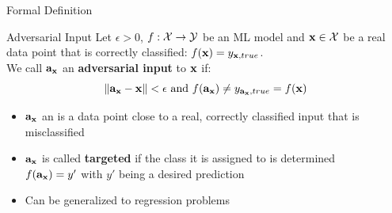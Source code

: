 \documentclass[10pt,compress,t,notes=noshow, xcolor=table]{beamer}
\begin{document}
\begin{vbframe}[c]{Formal Definition}
\begin{block}{Adversarial Input}
Let $\epsilon>0$, $f:\mathcal{X} \rightarrow \mathcal{Y}$ be an ML model and $\mathbf{x} \in \mathcal{X}$ be a real data point that is correctly classified: $f(\mathbf{x})=y_{\mathbf{x},true}$. \\\medskip
 We call $\mathbf{a}_{\mathbf{x}}$ an \textbf{adversarial input} to $\mathbf{x}$ if:
\begin{equation*}
    \| \mathbf{a}_{\mathbf{x}}- \mathbf{x}\|<\epsilon\text{ and } f(\mathbf{a}_{\mathbf{x}})\neq y_{\mathbf{a}_{\mathbf{x}},true}=f(\mathbf{x})
\end{equation*}
\end{block}
\begin{itemize}
    \item $\mathbf{a}_{\mathbf{x}}$ an is a data point close to a real, correctly classified input that is misclassified
    \item $\mathbf{a}_{\mathbf{x}}$ is called \textbf{targeted} if the class it is assigned to is determined\\
    $f(\mathbf{a}_{\mathbf{x}})=y'$ with $y'$ being a desired prediction
    \item Can be generalized to regression problems
\end{itemize}
\end{vbframe}


\end{document}
